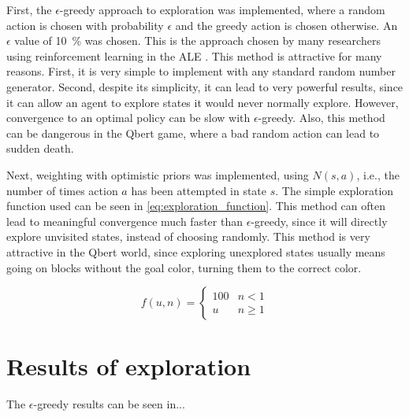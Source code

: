 \documentclass[a4paper,titlepage]{article}
\begin{document}
	First, the $\epsilon$-greedy approach to exploration was implemented, where a random action is chosen with probability $\epsilon$ and the greedy action is chosen otherwise. An $\epsilon$ value of \SI{10}{\percent} was chosen. This is the approach chosen by many researchers using reinforcement learning in the ALE \cite{defazio,bellemare,mnih}. This method is attractive for many reasons. First, it is very simple to implement with any standard random number generator. Second, despite its simplicity, it can lead to very powerful results, since it can allow an agent to explore states it would never normally explore. However, convergence to an optimal policy can be slow with $\epsilon$-greedy. Also, this method can be dangerous in the Qbert game, where a bad random action can lead to sudden death.
	
	
	Next, weighting with optimistic priors was implemented, using $N(s, a)$, i.e., the number of times action $a$ has been attempted in state $s$. The simple exploration function used can be seen in \cref{eq:exploration_function}. This method can often lead to meaningful convergence much faster than $\epsilon$-greedy, since it will directly explore unvisited states, instead of choosing randomly. This method is very attractive in the Qbert world, since exploring unexplored states usually means going on blocks without the goal color, turning them to the correct color.
	
	\begin{equation} \label{eq:exploration_function}
		f(u, n) =
		\begin{cases}
			100 & n < 1 \\
			u & n \geq 1
		\end{cases}
	\end{equation}
	
	
	
	\section{Results of exploration}
	
	The $\epsilon$-greedy results can be seen in...
	
	
\end{document}
